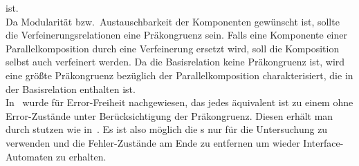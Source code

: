ist.\\
Da Modularität bzw.\ Austauschbarkeit der Komponenten gewünscht ist, sollte die
Verfeinerungsrelationen eine Präkongruenz sein. Falls eine Komponente einer
Parallelkomposition durch eine Verfeinerung ersetzt wird, soll die Komposition
selbst auch verfeinert werden. Da die Basisrelation keine Präkongruenz ist,
wird eine größte Präkongruenz bezüglich der Parallelkomposition
charakterisiert, die in der Basisrelation enthalten ist.\\
In~\cite{Vogler2014EIO} wurde für Error-Freiheit nachgewiesen, das jedes \EIO{}
äquivalent ist zu einem ohne Error-Zustände unter Berücksichtigung der
Präkongruenz. Diesen erhält man durch stutzen wie in~\cite{Alfaro2004}. Es ist
also möglich die \EIO{}s nur für die Untersuchung zu verwenden und die
Fehler-Zustände am Ende zu entfernen um wieder Interface-Automaten zu
erhalten.\\

